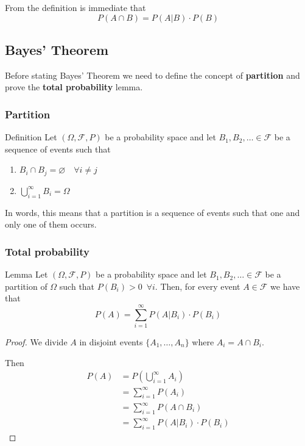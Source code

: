 \documentclass[10pt]{extarticle}
\newcommand{\F}{\mathcal{F}}
\begin{document}
From the definition is immediate that
$$
    P(A \cap B) = P(A|B) \cdot P(B)
$$

\subsection{Bayes' Theorem}

Before stating Bayes' Theorem we need to define the concept of \textbf{partition} and prove the \textbf{total probability} lemma.

\subsubsection{Partition}

\begin{bluebox}{Definition}
    Let $(\Omega, \F, P)$ be a probability space and let $B_1, B_2, \dots \in \F$ be a sequence of events such that
    \begin{enumerate}
        \item $B_i \cap B_j = \varnothing \quad \forall i \ne j$
        \item $\bigcup_{i=1}^\infty B_i = \Omega$
    \end{enumerate}
\end{bluebox}

In words, this means that a partition is a sequence of events such that one and only one of them occurs.

\subsubsection{Total probability}

\begin{bluebox}{Lemma}
    Let $(\Omega, \F, P)$ be a probability space and let $B_1, B_2, \dots \in \F$ be a partition of $\Omega$
    such that $P(B_i) > 0 \enspace \forall i$.
    Then, for every event $A \in \F$ we have that
    $$
        P(A) = \sum_{i=1}^\infty P(A|B_i) \cdot P(B_i)
    $$
\end{bluebox}

\begin{proof}
    We divide $A$ in disjoint events $\{A_1, \dots, A_n\}$ where $A_i = A \cap B_i$.

    Then
    \begin{align*}
        P(A) & = P\left(\bigcup_{i=1}^\infty A_i\right)  \\
             & = \sum_{i=1}^\infty P(A_i)                \\
             & = \sum_{i=1}^\infty P(A \cap B_i)         \\
             & = \sum_{i=1}^\infty P(A|B_i) \cdot P(B_i)
    \end{align*}
\end{proof}
\end{document}
